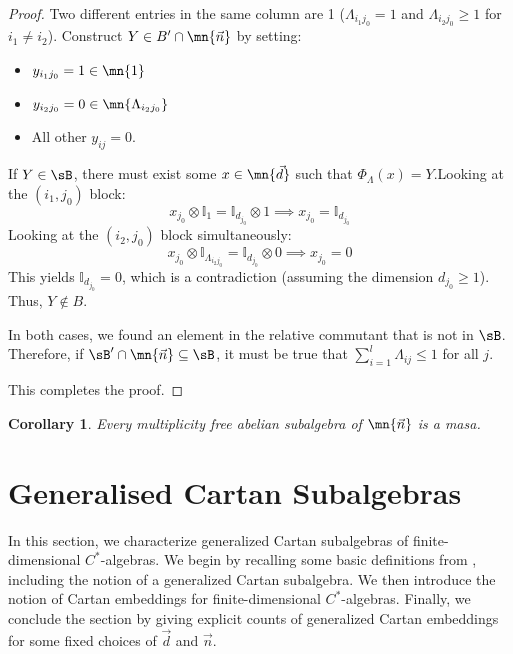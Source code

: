 \documentclass[12pt,a4paper]{amsart}
\theoremstyle{plain}
\newtheorem{cor}[theorem]{Corollary}
\theoremstyle{definition}
\theoremstyle{remark}
\numberwithin{equation}{section}
\theoremstyle{ser}
\theoremstyle{serr}
\theoremstyle{ser}
\theoremstyle{ser}
\theoremstyle{collabquestion}
\newcommand{\<}{\langle}
\renewcommand{\>}{\rangle}
\begin{document}
\begin{proof}
     Two different entries in the same column are 1 ($\Lambda_{i_1 j_0} = 1$ and $\Lambda_{i_2 j_0} \ge 1$ for $i_1 \neq i_2$).
    Construct $Y \in B' \cap \mn{\vec{n}}$ by setting:
    \begin{itemize}
        \item[1.] $y_{i_1 j_0} = 1 \in \mn{1}$
        \item[2.] $y_{i_2 j_0} = 0 \in \mn{\Lambda_{i_2 j_0}}$
        \item[3.] All other $y_{ij} = 0$.
    \end{itemize}
    If $Y \in \sB$, there must exist some $x \in \mn{\vec{d}}$ such that $\Phi_\Lambda(x) = Y$.Looking at the $(i_1, j_0)$ block:
    $$x_{j_0} \otimes \mathbb{I}_1 = \mathbb{I}_{d_{j_0}} \otimes 1 \implies x_{j_0} = \mathbb{I}_{d_{j_0}}$$
    Looking at the $(i_2, j_0)$ block simultaneously:
    $$x_{j_0} \otimes \mathbb{I}_{\Lambda_{i_2 j_0}} = \mathbb{I}_{d_{j_0}} \otimes 0 \implies x_{j_0} = 0$$
    This yields $\mathbb{I}_{d_{j_0}} = 0$, which is a contradiction (assuming the dimension $d_{j_0} \ge 1$). Thus, $Y \notin B$.

    In both cases, we found an element in the relative commutant that is not in $\sB$. Therefore, if $\sB' \cap \mn{\vec{n}} \subseteq \sB$, it must be true that $\sum_{i=1}^l \Lambda_{ij} \le 1$ for all $j$.

    This completes the proof.
\end{proof}

\begin{cor}
    Every multiplicity free abelian subalgebra of $\mn{\vec{n}}$ is a masa.
\end{cor}

    \section{Generalised Cartan Subalgebras}
    \label{sec:gen_cartan}

In this section, we characterize generalized Cartan subalgebras of finite-dimensional $C^*$-algebras. We begin by recalling some basic definitions from \cite{Exel2011}, including the notion of a generalized Cartan subalgebra. We then introduce the notion of Cartan embeddings for finite-dimensional $C^*$-algebras. Finally, we conclude the section by giving explicit counts of generalized Cartan embeddings for some fixed choices of $\vec{d}$ and $\vec{n}$.
\end{document}
